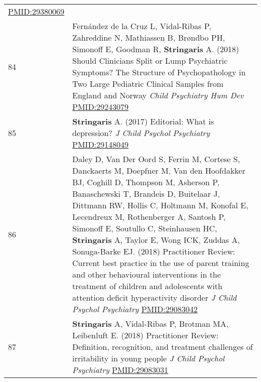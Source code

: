 \documentclass[
]{article}
\begin{document}
\begin{longtable}[]{@{}ll@{}}
\begin{minipage}[t]{0.94\columnwidth}
\url{PMID:29380069}\strut
\end{minipage}\tabularnewline
\begin{minipage}[t]{0.01\columnwidth}\raggedright
84\strut
\end{minipage} & \begin{minipage}[t]{0.94\columnwidth}\raggedright
Fernández de la Cruz L, Vidal-Ribas P, Zahreddine N, Mathiassen B,
Brøndbo PH, Simonoff E, Goodman R, \textbf{Stringaris} A. (2018) Should
Clinicians Split or Lump Psychiatric Symptoms? The Structure of
Psychopathology in Two Large Pediatric Clinical Samples from England and
Norway \emph{Child Psychiatry Hum Dev} \url{PMID:29243079}\strut
\end{minipage}\tabularnewline
\begin{minipage}[t]{0.01\columnwidth}\raggedright
85\strut
\end{minipage} & \begin{minipage}[t]{0.94\columnwidth}\raggedright
\textbf{Stringaris} A. (2017) Editorial: What is depression? \emph{J
Child Psychol Psychiatry} \url{PMID:29148049}\strut
\end{minipage}\tabularnewline
\begin{minipage}[t]{0.01\columnwidth}\raggedright
86\strut
\end{minipage} & \begin{minipage}[t]{0.94\columnwidth}\raggedright
Daley D, Van Der Oord S, Ferrin M, Cortese S, Danckaerts M, Doepfner M,
Van den Hoofdakker BJ, Coghill D, Thompson M, Asherson P, Banaschewski
T, Brandeis D, Buitelaar J, Dittmann RW, Hollis C, Holtmann M, Konofal
E, Lecendreux M, Rothenberger A, Santosh P, Simonoff E, Soutullo C,
Steinhausen HC, \textbf{Stringaris} A, Taylor E, Wong ICK, Zuddas A,
Sonuga-Barke EJ. (2018) Practitioner Review: Current best practice in
the use of parent training and other behavioural interventions in the
treatment of children and adolescents with attention deficit
hyperactivity disorder \emph{J Child Psychol Psychiatry}
\url{PMID:29083042}\strut
\end{minipage}\tabularnewline
\begin{minipage}[t]{0.01\columnwidth}\raggedright
87\strut
\end{minipage} & \begin{minipage}[t]{0.94\columnwidth}\raggedright
\textbf{Stringaris} A, Vidal-Ribas P, Brotman MA, Leibenluft E. (2018)
Practitioner Review: Definition, recognition, and treatment challenges
of irritability in young people \emph{J Child Psychol Psychiatry}
\url{PMID:29083031}\strut

\end{minipage}
\end{longtable}
\end{document}
